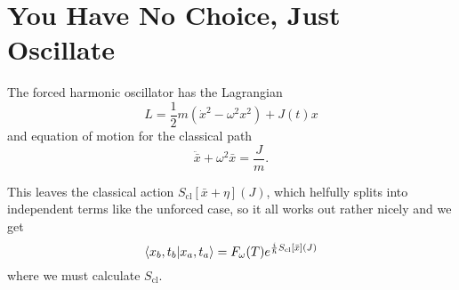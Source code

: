 \documentclass[]{scrreprt}
\renewcommand\hbar\hslash
\begin{document}
\section{You Have No Choice, Just Oscillate}
The forced harmonic oscillator has the Lagrangian
\[ L = \frac{1}{2} m (\dot{x}^2 - \omega^2 x^2) + J(t)x \]
and equation of motion for the classical path
\[ \ddot{\bar{x}} + \omega^2 \bar{x} = \frac{J}{m}. \]

This leaves the classical action \(S_\mathrm{cl}[\bar{x} + \eta](J) \), which helfully splits into independent terms like the unforced case, so it all works out rather nicely and we get
\begin{equation*}
  \braket{x_b, t_b}{x_a, t_a} = F_\omega(T)e^{\frac{i}{\hbar} S_\mathrm{cl}[\bar{x}](J)}
\end{equation*}
where we must calculate \(S_\mathrm{cl}\).


\printbibliography
\end{document}
